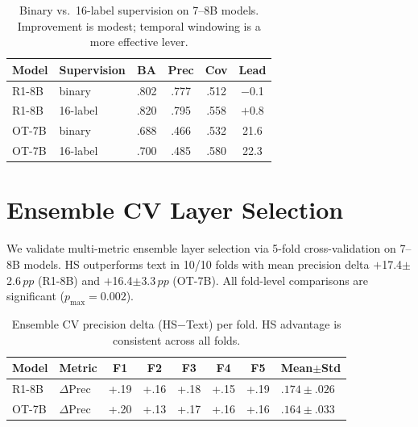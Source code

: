 \documentclass[11pt,a4paper]{article}
\newcommand{\pp}{\,pp}
\begin{document}
\begin{table}[h]
\centering
\small
\begin{tabular}{llcccc}
\toprule
\textbf{Model} & \textbf{Supervision} & \textbf{BA} & \textbf{Prec} & \textbf{Cov} & \textbf{Lead} \\
\midrule
R1-8B & binary & .802 & .777 & .512 & $-$0.1 \\
R1-8B & 16-label & .820 & .795 & .558 & $+$0.8 \\
OT-7B & binary & .688 & .466 & .532 & 21.6 \\
OT-7B & 16-label & .700 & .485 & .580 & 22.3 \\
\bottomrule
\end{tabular}
\caption{Binary vs.\ 16-label supervision on 7--8B models. Improvement is modest; temporal windowing is a more effective lever.}
\label{tab:taxonomy}
\end{table}

\section{Ensemble CV Layer Selection}
\label{app:ensemble_cv}

We validate multi-metric ensemble layer selection via 5-fold cross-validation on 7--8B models.
HS outperforms text in 10/10 folds with mean precision delta $+$17.4$\pm$2.6$\pp$ (R1-8B) and $+$16.4$\pm$3.3$\pp$ (OT-7B).
All fold-level comparisons are significant ($p_{\max}=0.002$).

\begin{table}[h]
\centering
\small
\begin{tabular}{llcccccl}
\toprule
\textbf{Model} & \textbf{Metric} & \textbf{F1} & \textbf{F2} & \textbf{F3} & \textbf{F4} & \textbf{F5} & \textbf{Mean$\pm$Std} \\
\midrule
R1-8B & $\Delta$Prec & +.19 & +.16 & +.18 & +.15 & +.19 & $.174\pm.026$ \\
OT-7B & $\Delta$Prec & +.20 & +.13 & +.17 & +.16 & +.16 & $.164\pm.033$ \\
\bottomrule
\end{tabular}
\caption{Ensemble CV precision delta (HS$-$Text) per fold. HS advantage is consistent across all folds.}
\label{tab:ensemble_cv}
\end{table}
\end{document}
